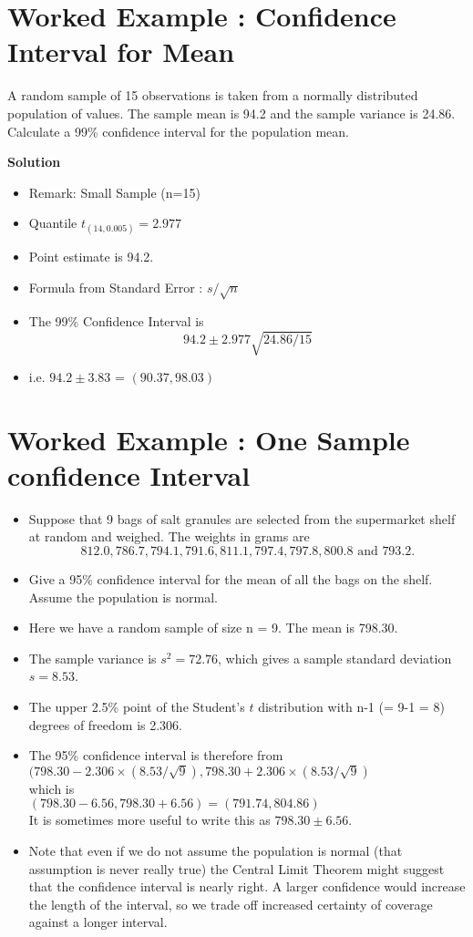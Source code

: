 \documentclass[]{report}
\begin{document}
\large
\section*{Worked Example : Confidence Interval for Mean }
A random sample of 15 observations is taken from a normally distributed population
of values. The sample mean is 94.2 and the sample variance is 24.86.
Calculate a 99\% confidence interval for the population mean.


\noindent \textbf{Solution}
\begin{itemize}
\item Remark: Small Sample (n=15)
\item Quantile $t_(14,0.005) = 2.977$
\item Point estimate is 94.2.
\item Formula from Standard Error : $ s/\sqrt{n}$
\item The 99\% Confidence Interval is \[94.2 \pm 2.977 \sqrt{24.86/15} \]
\item i.e. $94.2 \pm 3.83$ =  $(90.37,98.03)$
\end{itemize}
\newpage 
\section*{Worked Example : One Sample confidence Interval}
\begin{itemize}
\item Suppose that 9 bags of salt granules are selected from the supermarket
shelf at random and weighed. The weights in grams are \[812.0, 786.7, 794.1,
791.6, 811.1, 797.4, 797.8, 800.8 \mbox{ and } 793.2.\] 
\item Give a 95\% confidence interval for the
mean of all the bags on the shelf. Assume the population is normal.


\item Here we have a random sample of size n = 9. The mean is 798.30. 
\item The sample
variance is $s^2 = 72.76$, which gives a sample standard deviation $s = 8.53$.

\item The upper 2.5\% point of the Student's $t$ distribution with n-1 (= 9-1 = 8) degrees of freedom is 2.306.

\item The 95\% confidence interval is therefore from \\
$(798.30 - 2.306 \times (8.53/\sqrt{9}), 798.30 + 2.306 \times (8.53/\sqrt{9})$\\
which is\\
$(798.30 - 6.56, 798.30 + 6.56) = (791.74, 804.86)$\\
It is sometimes more useful to write this as $798.30 \pm 6.56$.

\item Note that even if we do not assume the population is normal (that assumption is
never really true) the Central Limit Theorem might suggest that the confidence interval
is nearly right. A larger confidence would increase the length of the interval, so we
trade off increased certainty of coverage against a longer interval.
\end{itemize}
\end{document}
